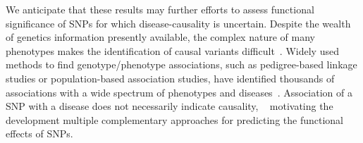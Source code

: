 \documentclass[10pt,letterpaper]{article}
\begin{document}
We anticipate that these results may further efforts to assess functional significance of SNPs for which disease-causality is uncertain.  Despite the wealth of genetics information presently available, %
the complex nature of many phenotypes makes the identification of causal variants difficult~\cite{Claussnitzer2020}. Widely used methods to find genotype/phenotype associations, such as pedigree-based linkage studies or population-based association studies, have identified thousands of associations with a wide spectrum of phenotypes and diseases~\cite{Buniello2019, Gallagher2018, Tam2019}. Association of a SNP with a disease does not necessarily indicate  causality, ~\cite{Boyle2017, Goldstein2009, McClellan2010,MacArthur2014}  %
motivating the development multiple complementary approaches for predicting the functional effects of SNPs. 

\end{document}
